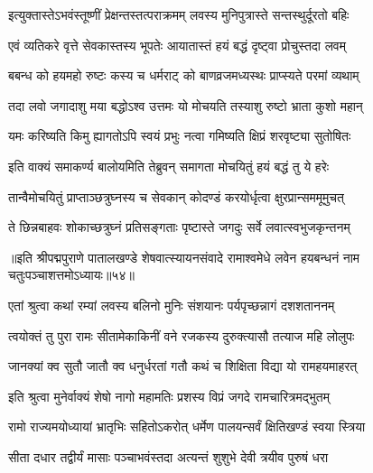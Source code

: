 \twolineshloka
{इत्युक्तास्तेऽभवंस्तूष्णीं प्रेक्षन्तस्तत्पराक्रमम्}
{लवस्य मुनिपुत्रास्ते सन्तस्थुर्दूरतो बहिः}%

\twolineshloka
{एवं व्यतिकरे वृत्ते सेवकास्तस्य भूपतेः}
{आयातास्तं हयं बद्धं दृष्ट्वा प्रोचुस्तदा लवम्}%

\twolineshloka
{बबन्ध को हयमहो रुष्टः कस्य च धर्मराट्}
{को बाणव्रजमध्यस्थः प्राप्स्यते परमां व्यथाम्}%

\twolineshloka
{तदा लवो जगादाशु मया बद्धोऽश्व उत्तमः}
{यो मोचयति तस्याशु रुष्टो भ्राता कुशो महान्}%

\twolineshloka
{यमः करिष्यति किमु ह्यागतोऽपि स्वयं प्रभुः}
{नत्वा गमिष्यति क्षिप्रं शरवृष्ट्या सुतोषितः}%


\twolineshloka
{इति वाक्यं समाकर्ण्य बालोयमिति तेब्रुवन्}
{समागता मोचयितुं हयं बद्धं तु ये हरेः}%

\twolineshloka
{तान्वैमोचयितुं प्राप्ताञ्छत्रुघ्नस्य च सेवकान्}
{कोदण्डं करयोर्धृत्वा क्षुरप्रान्सममूमुचत्}%

\twolineshloka
{ते छिन्नबाहवः शोकाच्छत्रुघ्नं प्रतिसङ्गताः}
{पृष्टास्ते जगदुः सर्वे लवात्स्वभुजकृन्तनम्}%

{॥इति श्रीपद्मपुराणे पातालखण्डे शेषवात्स्यायनसंवादे रामाश्वमेधे लवेन हयबन्धनं नाम चतुःपञ्चाशत्तमोऽध्यायः॥५४॥}

\resetShloka


\twolineshloka
{एतां श्रुत्वा कथां रम्यां लवस्य बलिनो मुनिः}
{संशयानः पर्यपृच्छन्नागं दशशताननम्}%


\twolineshloka
{त्वयोक्तं तु पुरा रामः सीतामेकाकिनीं वने}
{रजकस्य दुरुक्त्यासौ तत्याज महि लोलुपः}%

\twolineshloka
{जानक्यां क्व सुतौ जातौ क्व धनुर्धरतां गतौ}
{कथं च शिक्षिता विद्या यो रामहयमाहरत्}%


\twolineshloka
{इति श्रुत्वा मुनेर्वाक्यं शेषो नागो महामतिः}
{प्रशस्य विप्रं जगदे रामचारित्रमद्भुतम्}%


\twolineshloka
{रामो राज्यमयोध्यायां भ्रातृभिः सहितोऽकरोत्}
{धर्मेण पालयन्सर्वं क्षितिखण्डं स्वया स्त्रिया}%

\twolineshloka
{सीता दधार तद्वीर्यं मासाः पञ्चाभवंस्तदा}
{अत्यन्तं शुशुभे देवी त्रयीव पुरुषं धरा}%

